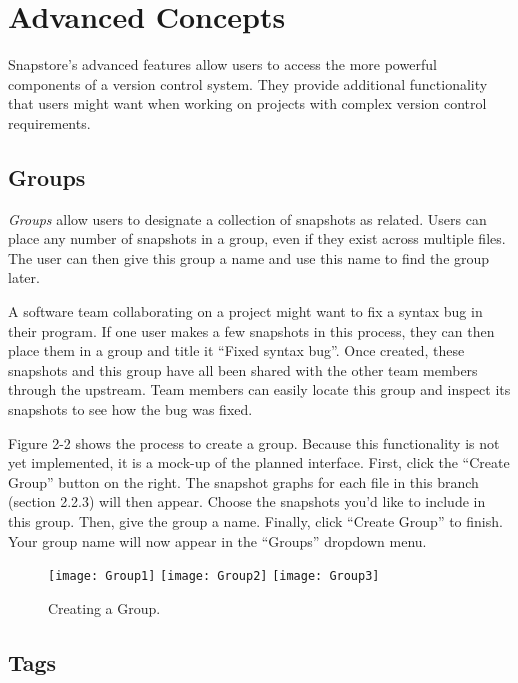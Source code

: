 \section{Advanced Concepts}

Snapstore's advanced features allow users to access the more powerful components of a version control system. They provide additional functionality that users might want when working on projects with complex version control requirements.

\subsection{Groups}

\textit{Groups} allow users to designate a collection of snapshots as related. Users can place any number of snapshots in a group, even if they exist across multiple files. The user can then give this group a name and use this name to find the group later.

A software team collaborating on a project might want to fix a syntax bug in their program. If one user makes a few snapshots in this process, they can then place them in a group and title it ``Fixed syntax bug''. Once created, these snapshots and this group have all been shared with the other team members through the upstream. Team members can easily locate this group and inspect its snapshots to see how the bug was fixed. 

Figure 2-2 shows the process to create a group. Because this functionality is not yet implemented, it is a mock-up of the planned interface. First, click the ``Create Group'' button on the right. The snapshot graphs for each file in this branch (section 2.2.3) will then appear. Choose the snapshots you'd like to include in this group. Then, give the group a name. Finally, click ``Create Group'' to finish. Your group name will now appear in the ``Groups'' dropdown menu.

\begin{figure}
\begin{center}
\texttt{[image: Group1]}
\texttt{[image: Group2]}
\texttt{[image: Group3]}
\end{center}
\caption{Creating a Group.}
\label{arm:fig1}
\end{figure}

\subsection{Tags}

